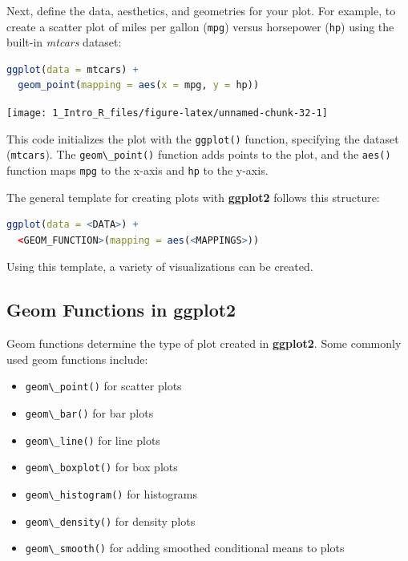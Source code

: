 \documentclass[
  11pt,
]{book}
\newcommand{\passthrough}[1]{#1}
\providecommand{\tightlist}{%
  \setlength{\itemsep}{0pt}\setlength{\parskip}{0pt}}
\theoremstyle{definition}
\theoremstyle{definition}
\theoremstyle{definition}
\theoremstyle{definition}
\theoremstyle{remark}
\begin{document}
Next, define the data, aesthetics, and geometries for your plot. For example, to create a scatter plot of miles per gallon (\passthrough{\lstinline!mpg!}) versus horsepower (\passthrough{\lstinline!hp!}) using the built-in \emph{mtcars} dataset:

\begin{lstlisting}[language=R]
ggplot(data = mtcars) +
  geom_point(mapping = aes(x = mpg, y = hp))
\end{lstlisting}

\begin{center}\texttt{[image: 1\_Intro\_R\_files/figure-latex/unnamed-chunk-32-1]} \end{center}

This code initializes the plot with the \passthrough{\lstinline!ggplot()!} function, specifying the dataset (\passthrough{\lstinline!mtcars!}). The \passthrough{\lstinline!geom\_point()!} function adds points to the plot, and the \passthrough{\lstinline!aes()!} function maps \passthrough{\lstinline!mpg!} to the x-axis and \passthrough{\lstinline!hp!} to the y-axis.

The general template for creating plots with \textbf{ggplot2} follows this structure:

\begin{lstlisting}[language=R]
ggplot(data = <DATA>) +
  <GEOM_FUNCTION>(mapping = aes(<MAPPINGS>))
\end{lstlisting}

Using this template, a variety of visualizations can be created.

\subsection*{Geom Functions in ggplot2}\label{geom-functions-in-ggplot2}


Geom functions determine the type of plot created in \textbf{ggplot2}. Some commonly used geom functions include:

\begin{itemize}
\tightlist
\item
  \passthrough{\lstinline!geom\_point()!} for scatter plots\\
\item
  \passthrough{\lstinline!geom\_bar()!} for bar plots\\
\item
  \passthrough{\lstinline!geom\_line()!} for line plots\\
\item
  \passthrough{\lstinline!geom\_boxplot()!} for box plots\\
\item
  \passthrough{\lstinline!geom\_histogram()!} for histograms\\
\item
  \passthrough{\lstinline!geom\_density()!} for density plots\\
\item
  \passthrough{\lstinline!geom\_smooth()!} for adding smoothed conditional means to plots
\end{itemize}
\end{document}

